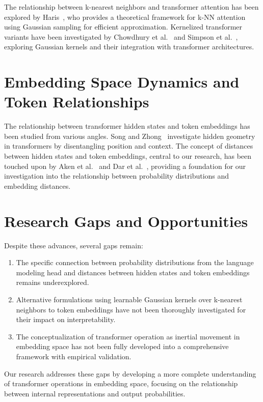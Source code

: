 The relationship between k-nearest neighbors and transformer attention has been explored by Haris~\cite{haris2024knn}, who provides a theoretical framework for k-NN attention using Gaussian sampling for efficient approximation. Kernelized transformer variants have been investigated by Chowdhury et al.~\cite{chowdhury2021learning} and Simpson et al.~\cite{simpson2021kernel}, exploring Gaussian kernels and their integration with transformer architectures.

\section{Embedding Space Dynamics and Token Relationships}

The relationship between transformer hidden states and token embeddings has been studied from various angles. Song and Zhong~\cite{song2023uncovering} investigate hidden geometry in transformers by disentangling position and context. The concept of distances between hidden states and token embeddings, central to our research, has been touched upon by Aken et al.~\cite{aken2020visbert} and Dar et al.~\cite{dar2022analyzing}, providing a foundation for our investigation into the relationship between probability distributions and embedding distances.

\section{Research Gaps and Opportunities}

Despite these advances, several gaps remain:

\begin{enumerate}
    \item The specific connection between probability distributions from the language modeling head and distances between hidden states and token embeddings remains underexplored.
    
    \item Alternative formulations using learnable Gaussian kernels over k-nearest neighbors to token embeddings have not been thoroughly investigated for their impact on interpretability.
    
    \item The conceptualization of transformer operation as inertial movement in embedding space has not been fully developed into a comprehensive framework with empirical validation.
\end{enumerate}

Our research addresses these gaps by developing a more complete understanding of transformer operations in embedding space, focusing on the relationship between internal representations and output probabilities.
